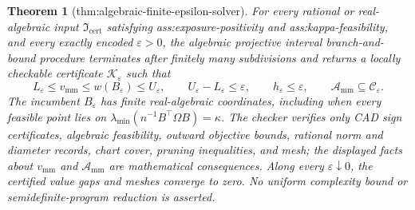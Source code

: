 \documentclass{article}
\newtheorem{theorem}{Theorem}
\begin{document}
\begin{theorem}[thm:algebraic-finite-epsilon-solver]\label{thm:algebraic-finite-epsilon-solver}
For every rational or real-algebraic input \(\mathfrak I_{\mathrm{cert}}\) satisfying ass:exposure-positivity and ass:kappa-feasibility, and every exactly encoded \(\varepsilon>0\), the algebraic projective interval branch-and-bound procedure terminates after finitely many subdivisions and returns a locally checkable certificate \(\mathscr K_{\varepsilon}\) such that
\[
 L_{\varepsilon}\le v_{\mathrm{mm}}\le w(B_{\varepsilon})\le U_{\varepsilon},
 \qquad U_{\varepsilon}-L_{\varepsilon}\le\varepsilon,
 \qquad h_{\varepsilon}\le\varepsilon,
 \qquad \mathcal A_{\mathrm{mm}}\subseteq\mathcal C_{\varepsilon}.
\]
The incumbent \(B_{\varepsilon}\) has finite real-algebraic coordinates, including when every feasible point lies on \(\lambda_{\min}(n^{-1}B^{\top}\Omega B)=\kappa\).  The checker verifies only CAD sign certificates, algebraic feasibility, outward objective bounds, rational norm and diameter records, chart cover, pruning inequalities, and mesh; the displayed facts about \(v_{\mathrm{mm}}\) and \(\mathcal A_{\mathrm{mm}}\) are mathematical consequences.  Along every \(\varepsilon\downarrow0\), the certified value gaps and meshes converge to zero.  No uniform complexity bound or semidefinite-program reduction is asserted.
\end{theorem}
\end{document}
